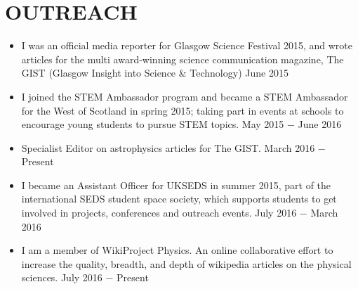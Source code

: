 
\section{OUTREACH}
\begin{itemize}
\item I was an official media reporter for Glasgow Science Festival 2015, and wrote articles for the multi award-winning science communication magazine, The GIST (Glasgow Insight into Science \& Technology)  \hfill June 2015 \\

\item I joined the STEM Ambassador program and became a STEM Ambassador for the West of Scotland in spring 2015; taking part in events at schools to encourage young students to pursue STEM topics.  \hfill May 2015 $-$ June 2016 \\

\item Specialist Editor on astrophysics articles for The GIST. \hfill March 2016 $-$ Present \\

\item I became an Assistant Officer for UKSEDS in summer 2015, part of the international SEDS student space society, which supports students to get involved in projects, conferences and outreach events. \hfill July 2016 $-$ March 2016\\

\item I am a member of WikiProject Physics. An online collaborative effort to increase the quality, breadth, and depth of wikipedia articles on the physical sciences. \hfill July 2016 $-$ Present\\

\end{itemize}

